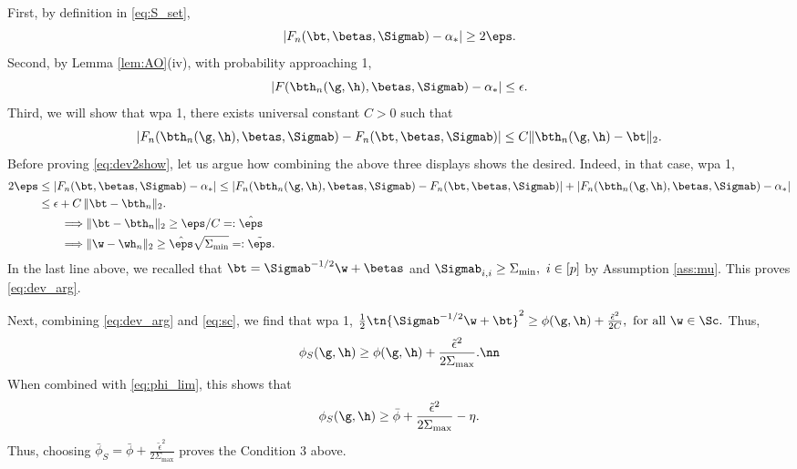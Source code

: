 \noindent First, by definition in \eqref{eq:S_set},
$$
|F_n(\bt,\betas,\Sigmab)-\alpha_*| \geq 2\eps.
$$
Second, by Lemma \ref{lem:AO}(iv), with probability approaching 1,
$$
|F(\bth_n(\g,\h),\betas,\Sigmab) - \alpha_*| \leq \epsilon.
$$
Third, we will show that wpa 1, there exists universal constant $C>0$ such that
\begin{align}
|F_n(\bth_n(\g,\h),\betas,\Sigmab) - F_n(\bt,\betas,\Sigmab)| \leq C {\|\bth_n(\g,\h) - \bt\|_2}\label{eq:dev2show}.
\end{align}
Before proving \eqref{eq:dev2show}, let us argue how combining the above three displays shows the desired. Indeed, in that case, wpa 1,
\begin{align*}
2\eps &\leq |F_n(\bt,\betas,\Sigmab)-\alpha_*| \leq |F_n(\bth_n(\g,\h),\betas,\Sigmab) - F_n(\bt,\betas,\Sigmab)| + |F_n(\bth_n(\g,\h),\betas,\Sigmab) - \alpha_*| \\
&\leq \epsilon + C \,\|\bt-\bth_n\|_2. \\
&\qquad\Longrightarrow \|\bt-\bth_n\|_2 \geq {\eps}/{C}=:\hat\eps\\
&\qquad\Longrightarrow \|\w-\wh_n\|_2 \geq \hat\eps\sqrt{\Sigma_{\min}}=:\tilde\eps.
\end{align*}
In the last line above, we recalled that $\bt=\Sigmab^{-1/2}\w+\betas$ and $\Sigmab_{i,i}\geq\Sigma_{\min},~i\in[p]$ by Assumption \ref{ass:mu}. This proves \eqref{eq:dev_arg}.

Next, combining \eqref{eq:dev_arg} and \eqref{eq:sc}, we find that wpa 1,
$
\frac{1}{2}\tn{\Sigmab^{-1/2}\w+\bt}^2 \geq \phi(\g,\h) + \frac{\tilde\epsilon^2}{2C},~\text{for all}~ \w\in\Sc.
$
Thus, 
\begin{align}
\phi_S(\g,\h) \geq \phi(\g,\h) + \frac{\tilde\epsilon^2}{2\Sigma_{\max}}.\nn
\end{align}
When combined with \eqref{eq:phi_lim}, this shows that
\begin{align}
\phi_S(\g,\h) \geq \bar\phi + \frac{\tilde\epsilon^2}{2\Sigma_{\max}} - \eta.
\end{align}
Thus, choosing $\bar\phi_S = \bar\phi + \frac{\tilde\epsilon^2}{2\Sigma_{\max}}$ proves the Condition 3 above. 



